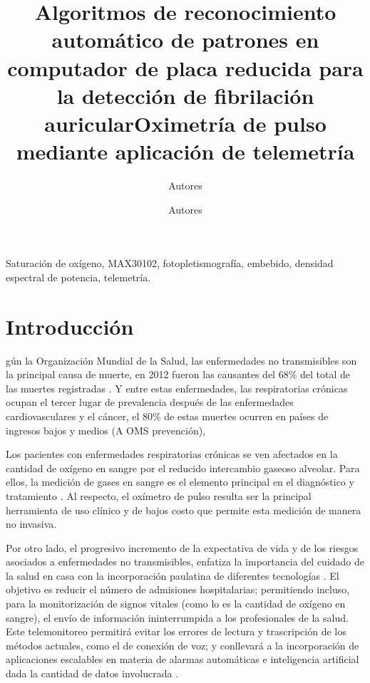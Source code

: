 \documentclass[journal]{IEEEtran}
\title{Algoritmos de reconocimiento automático de patrones en computador de placa reducida para la detección de fibrilación auricular}
\author{Autores \\ %
\and
Autores
 \\ \IEEEauthorblockN{Servicio Nacional de Aprendizaje, Centro de Electriciad Electrónica y Telecomunicaciones}
}
\begin{document}
\title{Oximetría de pulso mediante aplicación de telemetría}
\maketitle


\begin{abstract}



   
\end{abstract}
\IEEEpeerreviewmaketitle

\begin{IEEEkeywords}
	Saturación de oxígeno, MAX30102, fotopletismografía, embebido, densidad espectral de potencia, telemetría.
\end{IEEEkeywords}


\section{Introducción}



gún la Organización Mundial de la Salud, las enfermedades no transmisibles son la principal causa de muerte, en 2012 fueron las causantes del 68\% del total de las muertes registradas \cite{A_OMS_informe}. Y entre estas enfermedades, las respiratorias crónicas ocupan el tercer lugar de prevalencia después de las enfermedades cardiovasculares y el cáncer, el 80\% de estas muertes ocurren en países de ingresos bajos y medios  (A OMS prevención), \cite{A_OMS_prevencion}

Los pacientes con enfermedades respiratorias crónicas se ven afectados en la cantidad de oxígeno en sangre por el reducido intercambio gaseoso alveolar. Para ellos, la medición de gases en sangre es el elemento principal en el diagnóstico y tratamiento \cite{A_webster_spo2}.  Al respecto, el oxímetro de pulso resulta ser la principal herramienta de uso clínico y de bajos costo que permite esta medición de manera no invasiva.

Por otro lado, el progresivo incremento de la expectativa de vida y de los riesgos asociados a enfermedades no transmisibles, enfatiza la importancia del cuidado de la salud en casa con la incorporación paulatina de diferentes tecnologías \cite{A_webster_home_care}. El objetivo es reducir el número de admisiones hospitalarias; permitiendo incluso, para la monitorización de signos vitales (como lo es la cantidad de oxígeno en sangre), el envío de información ininterrumpida a los profesionales de la salud. Este telemonitoreo permitirá evitar los errores de lectura y trascripción de los métodos actuales, como el de conexión de voz; y conllevará  a la incorporación de aplicaciones escalables en materia de alarmas automáticas e inteligencia artificial dada la cantidad de datos involucrada \cite{A_telemedicina}.
\end{document}
